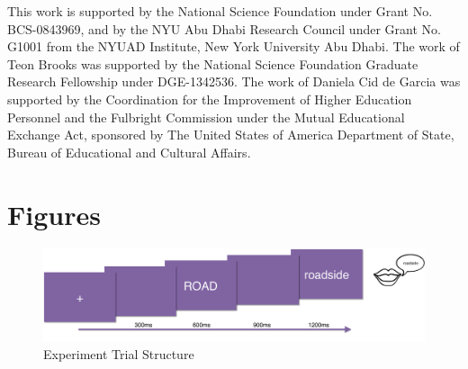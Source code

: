 \documentclass{frontiersSCNS}
\begin{document}
This work is supported by the National Science Foundation under Grant No. BCS-0843969, and by the NYU Abu Dhabi Research Council under Grant No. G1001 from the NYUAD Institute, New York University Abu Dhabi.  The work of Teon Brooks was supported by the National Science Foundation Graduate Research Fellowship under DGE-1342536. The work of Daniela Cid de Garcia was supported by the Coordination for the Improvement of Higher Education Personnel and the Fulbright Commission under the Mutual Educational Exchange Act, sponsored by The United States of
America Department of State, Bureau of Educational and Cultural Affairs.



\section*{Figures}

\begin{figure}
\begin{centering}
\includegraphics[scale=0.4]{images/task}
\par\end{centering}
\caption{\label{fig:task} Experiment Trial Structure}
\end{figure}
\end{document}
